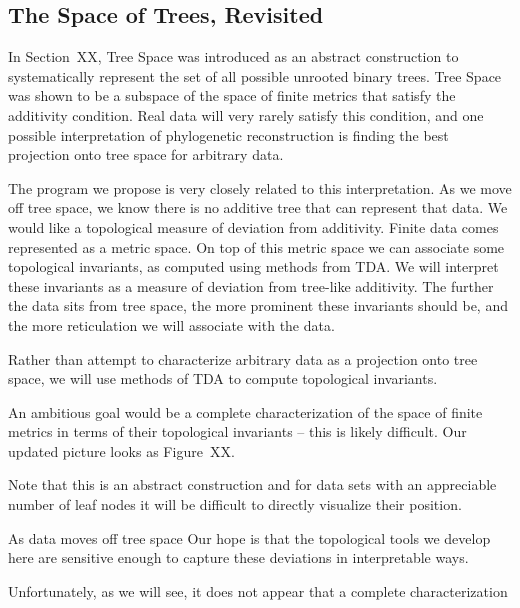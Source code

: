 \subsection{The Space of Trees, Revisited}

In Section~XX, Tree Space was introduced as an abstract construction to systematically represent the set of all possible unrooted binary trees.
Tree Space was shown to be a subspace of the space of finite metrics that satisfy the additivity condition.
Real data will very rarely satisfy this condition, and one possible interpretation of phylogenetic reconstruction is finding the best projection onto tree space for arbitrary data.




The program we propose is very closely related to this interpretation.
As we move off tree space, we know there is no additive tree that can represent that data.
We would like a topological measure of deviation from additivity.
Finite data comes represented as a metric space.
On top of this metric space we can associate some topological invariants, as computed using methods from TDA.
We will interpret these invariants as a measure of deviation from tree-like additivity.
The further the data sits from tree space, the more prominent these invariants should be, and the more reticulation we will associate with the data.

Rather than attempt to characterize arbitrary data as a projection onto tree space, we will use methods of TDA to compute topological invariants.

An ambitious goal would be a complete characterization of the space of finite metrics in terms of their topological invariants -- this is likely difficult.
Our updated picture looks as Figure~XX.

Note that this is an abstract construction and for data sets with an appreciable number of leaf nodes it will be difficult to directly visualize their position.

As data moves off tree space
Our hope is that the topological tools we develop here are sensitive enough to capture these deviations in interpretable ways.

Unfortunately, as we will see, it does not appear that a complete characterization 
